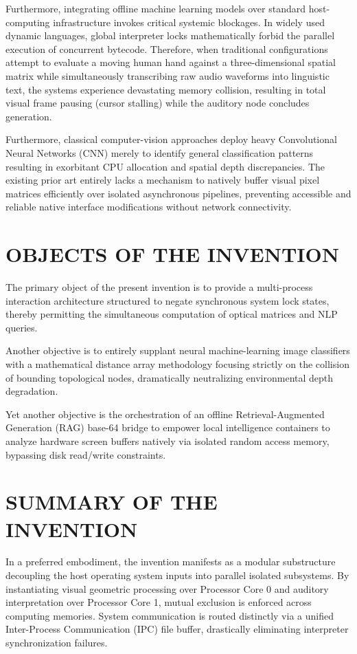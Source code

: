 \documentclass[12pt, a4paper]{article}
\begin{document}
Furthermore, integrating offline machine learning models over standard host-computing infrastructure invokes critical systemic blockages. In widely used dynamic languages, global interpreter locks mathematically forbid the parallel execution of concurrent bytecode. Therefore, when traditional configurations attempt to evaluate a moving human hand against a three-dimensional spatial matrix while simultaneously transcribing raw audio waveforms into linguistic text, the systems experience devastating memory collision, resulting in total visual frame pausing (cursor stalling) while the auditory node concludes generation.

Furthermore, classical computer-vision approaches deploy heavy Convolutional Neural Networks (CNN) merely to identify general classification patterns resulting in exorbitant CPU allocation and spatial depth discrepancies. The existing prior art entirely lacks a mechanism to natively buffer visual pixel matrices efficiently over isolated asynchronous pipelines, preventing accessible and reliable native interface modifications without network connectivity. 

\section*{OBJECTS OF THE INVENTION}
The primary object of the present invention is to provide a multi-process interaction architecture structured to negate synchronous system lock states, thereby permitting the simultaneous computation of optical matrices and NLP queries.

Another objective is to entirely supplant neural machine-learning image classifiers with a mathematical distance array methodology focusing strictly on the collision of bounding topological nodes, dramatically neutralizing environmental depth degradation.

Yet another objective is the orchestration of an offline Retrieval-Augmented Generation (RAG) base-64 bridge to empower local intelligence containers to analyze hardware screen buffers natively via isolated random access memory, bypassing disk read/write constraints.

\section*{SUMMARY OF THE INVENTION}
In a preferred embodiment, the invention manifests as a modular substructure decoupling the host operating system inputs into parallel isolated subsystems. By instantiating visual geometric processing over Processor Core 0 and auditory interpretation over Processor Core 1, mutual exclusion is enforced across computing memories. System communication is routed distinctly via a unified Inter-Process Communication (IPC) file buffer, drastically eliminating interpreter synchronization failures. 
\end{document}

